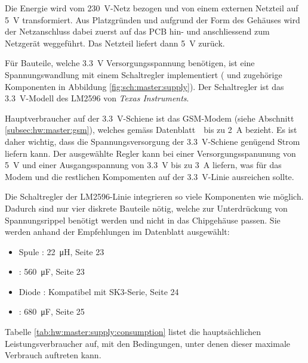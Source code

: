 Die  Energie wird  vom  \SI{230}{\volt}-Netz bezogen  und  von einem  externen
Netzteil auf \SI{5}{\volt} transformiert. Aus  Platzgr\"unden und aufgrund der
Form  des Geh\"auses  wird der  Netzanschluss dabei  zuerst auf  das PCB  hin-
und  anschliessend zum  Netzger\"at  weggef\"uhrt. Das  Netzteil liefert  dann
\SI{5}{\volt} zur\"uck.

F\"ur  Bauteile, welche  \SI{3.3}{\volt} Versorgungsspannung  ben\"otigen, ist
eine  Spannungswandlung  mit   einem  Schaltregler  implementiert  (
und  zugeh\"orige Komponenten  in Abbildung  \ref{fig:sch:master:supply}). Der
Schaltregler  ist  das  \SI{3.3}{\volt}-Modell   des  LM2596  von  \emph{Texas
Instruments}.

Hauptverbraucher   auf   der   \SI{3.3}{\volt}-Schiene   ist   das   GSM-Modem
(siehe     Abschnitt     \ref{subsec:hw:master:gsm}),     welches     gem\"ass
Datenblatt~\cite{ref:sim900:1}~bis   zu    \SI{2}{\ampere}   bezieht. Es   ist
daher  wichtig,  dass   die  Spannungsversorgung  der  \SI{3.3}{\volt}-Schiene
gen\"ugend  Strom  liefern  kann. Der  ausgew\"ahlte  Regler  kann  bei  einer
Versorgungsspanunung   von  \SI{5}{\volt}   und  einer   Ausgangsspannung  von
\SI{3.3}{\volt} bis  zu \SI{3}{\ampere} liefern,  was f\"ur das Modem  und die
restlichen Kompomenten auf der \SI{3.3}{\volt}-Linie ausreichen sollte.

Die  Schaltregler  der  LM2596-Linie  integrieren  so  viele  Komponenten  wie
m\"oglich. Dadurch  sind  nur  vier  diskrete  Bauteile  n\"otig,  welche  zur
Unterdr\"uckung  von  Spannungsrippel  ben\"otigt  werden  und  nicht  in  das
Chipgeh\"ause  passen. Sie  werden  anhand   der  Empfehlungen  im  Datenblatt
\cite{ref:lm2596} ausgew\"ahlt:

\begin{itemize}
    \tightlist
    \item
        Spule : \SI{22}{\micro\henry}, Seite 23
    \item
        : \SI{560}{\micro\farad}, Seite 23
    \item
        Diode : Kompatibel mit SK3-Serie, Seite 24
    \item
        : \SI{680}{\micro\farad}, Seite 25
\end{itemize}

Tabelle  \ref{tab:hw:master:supply:consumption}  listet die  haupts\"achlichen
Leistungsverbraucher  auf, mit  den Bedingungen,  unter denen  dieser maximale
Verbrauch auftreten kann.


